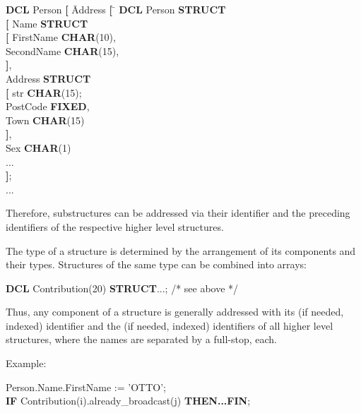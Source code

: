 \begin{tabbing}
{\bf DCL} Person \= {\bf [} \= Address \= {\bf [} \= \kill
{\bf DCL} Person \>         \> {\bf STRUCT} \> \> \\
                 \> {\bf [} \> Name    \>         \> {\bf STRUCT}\\
                 \>         \>         \> {\bf [} \> FirstName {\bf CHAR}(10),\\
                 \>         \>         \>         \> SecondName {\bf CHAR}(15),\\
                 \>         \>         \> {\bf ]},\> \\
                 \>         \> Address \>         \> {\bf STRUCT}\\
                 \>         \>         \> {\bf [} \> str {\bf CHAR}(15);\\
                 \>         \>         \>         \> PostCode {\bf FIXED},\\
                 \>         \>         \>         \> Town {\bf CHAR}(15)\\
                 \>         \>         \> {\bf ]},\> \\
                 \>         \> Sex     \>         \> {\bf CHAR}(1)\\
                 \>         \> ...     \>         \> \\
                 \> {\bf ]};\>         \>         \> \\
...              \>         \>         \>         \>
\end{tabbing}

Therefore, substructures can be addressed via their identifier and the
preceding identifiers of the respective higher level structures.

The type of a structure is determined by the arrangement of its components
and their types. Structures of the same type can be combined into arrays:

{\bf DCL} Contribution(20) {\bf STRUCT}...;  /* see above */

Thus, any component of a structure is generally addressed with its (if
needed, indexed) identifier and the (if needed, indexed) identifiers of
all higher level structures, where the names are separated by a full-stop,
each.

Example:

Person.Name.FirstName := 'OTTO';\\
{\bf IF} Contribution(i).already\_broadcast(j) {\bf THEN...FIN};

